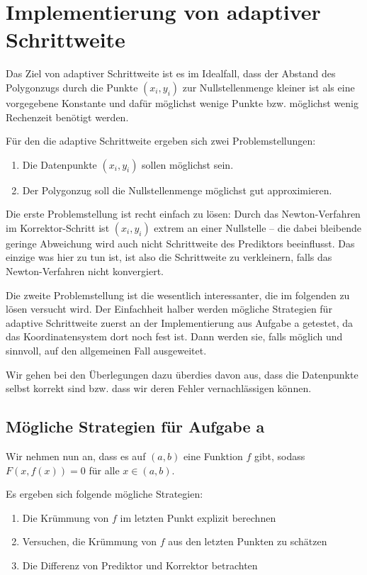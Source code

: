 \documentclass[a4paper,11pt,bibliography=totoc,listof=totoc,headinclude=true,cleardoublepage=empty,oneside]{scrartcl}
\begin{document}
\section{Implementierung von adaptiver Schrittweite}\label{chap:Schrittweite}
Das Ziel von adaptiver Schrittweite ist es im Idealfall, dass der Abstand des Polygonzugs durch die Punkte $(x_i,y_i)$ zur Nullstellenmenge kleiner ist als eine vorgegebene Konstante und dafür möglichst wenige Punkte bzw. möglichst wenig Rechenzeit benötigt werden.

Für den die adaptive Schrittweite ergeben sich zwei Problemstellungen:
\begin{enumerate}
	\item Die Datenpunkte $(x_i,y_i)$ sollen möglichst sein.
	\item Der Polygonzug soll die Nullstellenmenge möglichst gut approximieren.
\end{enumerate}

Die erste Problemstellung ist recht einfach zu lösen: Durch das Newton-Verfahren im Korrektor-Schritt ist $(x_i,y_i)$ extrem an einer Nullstelle -- die dabei bleibende geringe Abweichung wird auch nicht Schrittweite des Prediktors beeinflusst. Das einzige was hier zu tun ist, ist also die Schrittweite zu verkleinern, falls das Newton-Verfahren nicht konvergiert. 

Die zweite Problemstellung ist die wesentlich interessanter, die im folgenden zu lösen versucht wird. Der Einfachheit halber werden mögliche Strategien für adaptive Schrittweite zuerst an der Implementierung aus Aufgabe a getestet, da das Koordinatensystem dort noch fest ist. Dann werden sie, falls möglich und sinnvoll, auf den allgemeinen Fall ausgeweitet.

Wir gehen bei den Überlegungen dazu überdies davon aus, dass die Datenpunkte selbst korrekt sind bzw. dass wir deren Fehler vernachlässigen können.
\subsection{Mögliche Strategien für Aufgabe a}\label{chap:5.1}
Wir nehmen nun an, dass es auf $(a,b)$ eine Funktion $f$ gibt, sodass $F(x,f(x))=0$ für alle $x \in (a,b)$. 

Es ergeben sich folgende mögliche Strategien:
\begin{enumerate}
	\item Die Krümmung von $f$  im letzten Punkt explizit berechnen
	\item Versuchen, die Krümmung von $f$ aus den letzten Punkten zu schätzen 
	\item Die Differenz von Prediktor und Korrektor betrachten
\end{enumerate}
\end{document}
